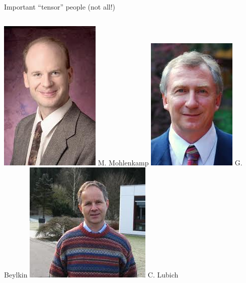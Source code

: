 \documentclass{beamer}[14pt, presentation]
\begin{document}
\begin{frame}[label=sec-1-3]{Important ``tensor'' people (not all!)}
\begin{columns}
\begin{column}{0.25\textwidth}
\includegraphics[height=0.15\textheight]{Mohlenkamp.jpeg}
\vskip 2mm
{\footnotesize M. Mohlenkamp}
\vskip 2mm
\includegraphics[height=0.15\textheight]{beylkin.jpeg}
\vskip 2mm
{\footnotesize G. Beylkin}
\vskip 2mm
\includegraphics[height=0.15\textheight]{lubich.jpeg}
\vskip 2mm
{\footnotesize C. Lubich}
\end{column}


\end{columns}
\end{frame}
\end{document}
